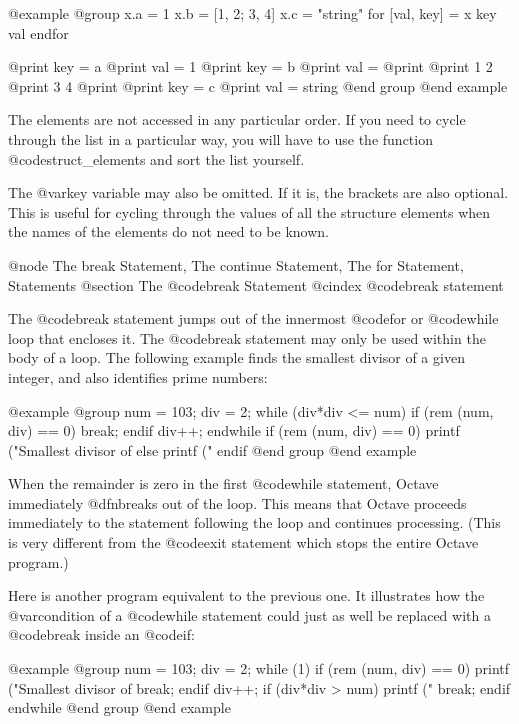 @example
@group
x.a = 1
x.b = [1, 2; 3, 4]
x.c = "string"
for [val, key] = x
  key
  val
endfor

     @print{} key = a
     @print{} val = 1
     @print{} key = b
     @print{} val =
     @print{} 
     @print{}   1  2
     @print{}   3  4
     @print{} 
     @print{} key = c
     @print{} val = string
@end group
@end example

The elements are not accessed in any particular order.  If you need to
cycle through the list in a particular way, you will have to use the
function @code{struct_elements} and sort the list yourself.

The @var{key} variable may also be omitted.  If it is, the brackets are
also optional.  This is useful for cycling through the values of all the
structure elements when the names of the elements do not need to be
known.

@node The break Statement, The continue Statement, The for Statement, Statements
@section The @code{break} Statement
@cindex @code{break} statement

The @code{break} statement jumps out of the innermost @code{for} or
@code{while} loop that encloses it.  The @code{break} statement may only
be used within the body of a loop.  The following example finds the
smallest divisor of a given integer, and also identifies prime numbers:

@example
@group
num = 103;
div = 2;
while (div*div <= num)
  if (rem (num, div) == 0)
    break;
  endif
  div++;
endwhile
if (rem (num, div) == 0)
  printf ("Smallest divisor of %
else
  printf ("%
endif
@end group
@end example

When the remainder is zero in the first @code{while} statement, Octave
immediately @dfn{breaks out} of the loop.  This means that Octave
proceeds immediately to the statement following the loop and continues
processing.  (This is very different from the @code{exit} statement
which stops the entire Octave program.)

Here is another program equivalent to the previous one.  It illustrates
how the @var{condition} of a @code{while} statement could just as well
be replaced with a @code{break} inside an @code{if}:

@example
@group
num = 103;
div = 2;
while (1)
  if (rem (num, div) == 0)
    printf ("Smallest divisor of %
    break;
  endif
  div++;
  if (div*div > num)
    printf ("%
    break;
  endif
endwhile
@end group
@end example

